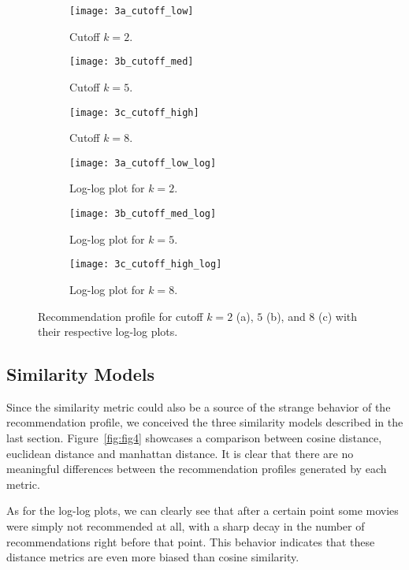 \begin{figure}
  \centering
  \begin{subfigure}{0.3\textwidth}
    \centering
    \texttt{[image: 3a\_cutoff\_low]}
    \caption{Cutoff $k = 2$.\label{fig:fig3a}}
  \end{subfigure}
  \begin{subfigure}{0.3\textwidth}
    \centering
    \texttt{[image: 3b\_cutoff\_med]}
    \caption{Cutoff $k = 5$.\label{fig:fig3b}}
  \end{subfigure}
  \begin{subfigure}{0.3\textwidth}
    \centering
    \texttt{[image: 3c\_cutoff\_high]}
    \caption{Cutoff $k = 8$.\label{fig:fig3c}}
  \end{subfigure}
  \begin{subfigure}{0.3\textwidth}
    \centering
    \texttt{[image: 3a\_cutoff\_low\_log]}
    \caption{Log-log plot for $k = 2$.\label{fig:fig3a}}
  \end{subfigure}
  \begin{subfigure}{0.3\textwidth}
    \centering
    \texttt{[image: 3b\_cutoff\_med\_log]}
    \caption{Log-log plot for $k = 5$.\label{fig:fig3b}}
  \end{subfigure}
  \begin{subfigure}{0.3\textwidth}
    \centering
    \texttt{[image: 3c\_cutoff\_high\_log]}
    \caption{Log-log plot for $k = 8$.\label{fig:fig3c}}
  \end{subfigure}
  \caption{Recommendation profile for cutoff $k = 2$ (a), $5$ (b), and $8$ (c)
    with their respective log-log plots. \label{fig:fig3}}
\end{figure}

\subsection{Similarity Models}
\label{subsec:similarity}

Since the similarity metric could also be a source of the strange behavior of
the recommendation profile, we conceived the three similarity models described
in the last section. Figure~\ref{fig:fig4} showcases a comparison between cosine
distance, euclidean distance and manhattan distance. It is clear that there are
no meaningful differences between the recommendation profiles generated by each
metric.

As for the log-log plots, we can clearly see that after a certain point some
movies were simply not recommended at all, with a sharp decay in the number of
recommendations right before that point. This behavior indicates that these
distance metrics are even more biased than cosine similarity.

